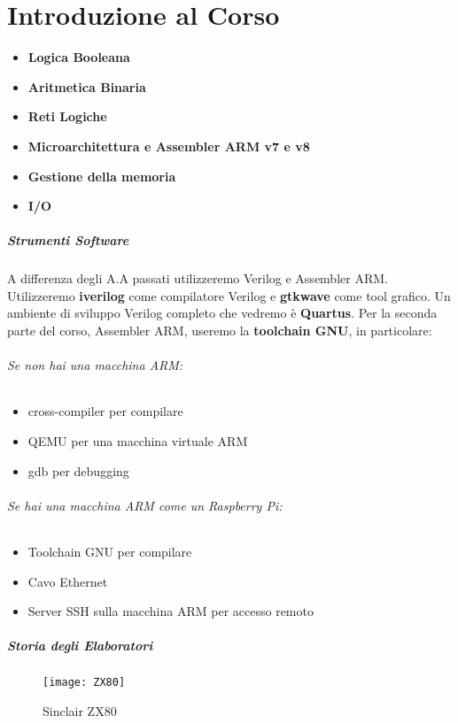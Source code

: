 \chapter{Introduzione al Corso}

\begin{itemize}
	\item{\textbf{Logica Booleana}}
	\item{\textbf{Aritmetica Binaria}}
	\item{\textbf{Reti Logiche}}
	\item{\textbf{Microarchitettura e Assembler ARM v7 e v8}}
	\item{\textbf{Gestione della memoria}}
	\item{\textbf{I/O}}
\end{itemize}

\paragraph{Strumenti Software}
A differenza degli A.A passati utilizzeremo Verilog e Assembler ARM.
Utilizzeremo \textbf{iverilog} come compilatore Verilog e \textbf{gtkwave} come tool grafico. Un ambiente di sviluppo Verilog completo che vedremo è \textbf{Quartus}.
Per la seconda parte del corso, Assembler ARM, useremo la \textbf{toolchain GNU}, in particolare:


\subparagraph{Se non hai una macchina ARM:}
\begin{itemize}
	\item{cross-compiler per compilare}
	\item{QEMU per una macchina virtuale ARM}
	\item{gdb per debugging}
\end{itemize}

\subparagraph{Se hai una macchina ARM come un Raspberry Pi:}
\begin{itemize}
	\item{Toolchain GNU per compilare}
	\item{Cavo Ethernet}
	\item{Server SSH sulla macchina ARM per accesso remoto}
\end{itemize}

\paragraph{Storia degli Elaboratori}

\begin{figure}
	\centering
	\caption{Sinclair ZX80}
	\texttt{[image: ZX80]}
\end{figure}

